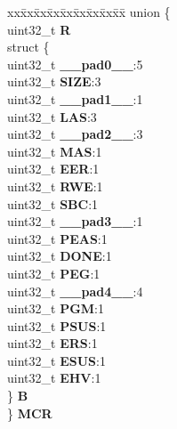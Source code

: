 \begin{DoxyCompactItemize}
\begin{tabbing}
\end{tabbing}\item 
\mbox{\label{structFLASH__tag_a672875a83ed09c9bcf7c30c976ec82d3}} 
\begin{tabbing}
xx\=xx\=xx\=xx\=xx\=xx\=xx\=xx\=xx\=\kill
union \{\\
\>uint32\_t {\bfseries R}\\
\>struct \{\\
\>\>uint32\_t {\bfseries \_\_pad0\_\_}:5\\
\>\>uint32\_t {\bfseries SIZE}:3\\
\>\>uint32\_t {\bfseries \_\_pad1\_\_}:1\\
\>\>uint32\_t {\bfseries LAS}:3\\
\>\>uint32\_t {\bfseries \_\_pad2\_\_}:3\\
\>\>uint32\_t {\bfseries MAS}:1\\
\>\>uint32\_t {\bfseries EER}:1\\
\>\>uint32\_t {\bfseries RWE}:1\\
\>\>uint32\_t {\bfseries SBC}:1\\
\>\>uint32\_t {\bfseries \_\_pad3\_\_}:1\\
\>\>uint32\_t {\bfseries PEAS}:1\\
\>\>uint32\_t {\bfseries DONE}:1\\
\>\>uint32\_t {\bfseries PEG}:1\\
\>\>uint32\_t {\bfseries \_\_pad4\_\_}:4\\
\>\>uint32\_t {\bfseries PGM}:1\\
\>\>uint32\_t {\bfseries PSUS}:1\\
\>\>uint32\_t {\bfseries ERS}:1\\
\>\>uint32\_t {\bfseries ESUS}:1\\
\>\>uint32\_t {\bfseries EHV}:1\\
\>\} {\bfseries B}\\
\} {\bfseries MCR}\\


\end{tabbing}
\end{DoxyCompactItemize}
